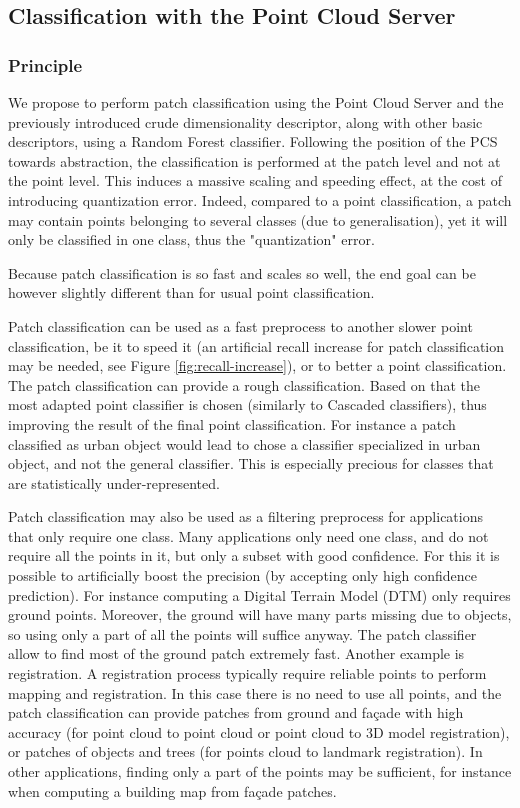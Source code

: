 		
	\subsection{Classification with the Point Cloud Server}
		\label{method.classif}
		\subsubsection{Principle}
		
		We propose to perform patch classification using the Point Cloud Server and the previously introduced crude dimensionality descriptor, along with other basic descriptors, using a Random Forest classifier.
		Following the position of the PCS towards abstraction, the classification is performed at the patch level and not at the point level. 
		This induces a massive scaling and speeding effect, at the cost of introducing quantization error.
		Indeed, compared to a point classification, a patch may contain points belonging to several classes (due to generalisation), yet it will only be classified in one class, thus the "quantization" error.
		
		Because patch classification is so fast and scales so well,
		the end goal can be however slightly different than for usual point classification.
		
		
		Patch classification can be used as a fast preprocess to another slower point classification,
		be it to speed it (an artificial recall increase for patch classification may be needed, see Figure \ref{fig:recall-increase}), or to better a point classification.
		The patch classification can provide a rough classification.
		Based on that the most adapted point classifier is chosen 
		(similarly to Cascaded classifiers),
		thus improving the result of the final point classification.
		For instance a patch classified as urban object would lead to chose a classifier specialized in urban object, and not the general classifier.
		This is especially precious for classes that are statistically under-represented.
		 
		Patch classification may also be used as a filtering preprocess for applications that only require one class. 
		Many applications only need one class, and do not require all the points in it, but only a subset with good confidence.
		For this it is possible to artificially boost the precision (by accepting only high confidence prediction).
		For instance computing a Digital Terrain Model (DTM) only requires ground points.
		Moreover, the ground will have many parts missing due to objects,
		so using only a part of all the points will suffice anyway. 
		The patch classifier allow to find most of the ground patch extremely fast.
		Another example is registration.
		A registration process typically require reliable points to perform mapping and registration.
		In this case there is no need to use all points,
		and the patch classification can provide patches from ground and façade with high accuracy
		(for point cloud to point cloud or point cloud to 3D model registration),
		or patches of objects and trees (for points cloud to landmark registration).
		In other applications, finding only a part of the points may be sufficient, for instance when computing a building map from façade patches.
		

